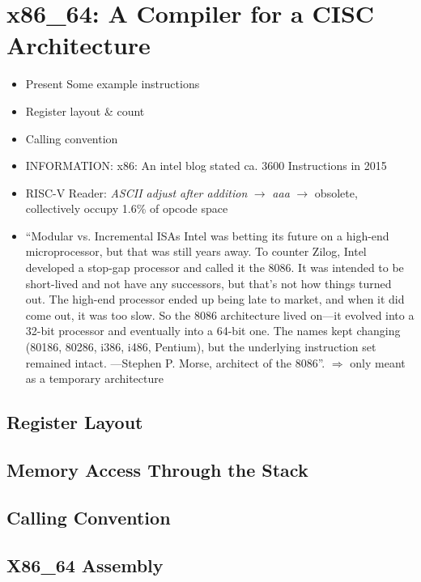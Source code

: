 \newpage
\section{x86\_64: A Compiler for a CISC Architecture}


\begin{itemize}
	\item Present Some example instructions
	\item Register layout \& count
	\item Calling convention
	\item INFORMATION: x86: An intel blog stated ca. 3600 Instructions in 2015 \cite{Rodgers2017}
    \item RISC-V Reader: \emph{ASCII adjust after addition} $\rightarrow$ \emph{aaa} $\rightarrow$ obsolete, collectively occupy 1.6\% of opcode space\cite[p.~4]{Patterson2017}
	\item
	      \enquote{Modular vs. Incremental ISAs Intel was betting its future on a high-end microprocessor, but that was still years away.
		      To counter Zilog, Intel developed a stop-gap processor and called it the 8086. It was intended to be short-lived and not have any successors,
		      but that’s not how things turned out. The high-end processor ended up being late to market, and when it did come out, it was too slow.
		      So the 8086 architecture lived on—it evolved into a 32-bit processor and eventually into a 64-bit one.
		      The names kept changing (80186, 80286, i386, i486, Pentium), but the underlying instruction set remained intact. —Stephen P. Morse, architect of the 8086}\cite{Morse2017}.
              $\Rightarrow$ only meant as a temporary architecture
\end{itemize}

\subsection{Register Layout}

\subsection{Memory Access Through the Stack}

\subsection{Calling Convention}

\subsection{X86\_64 Assembly}
